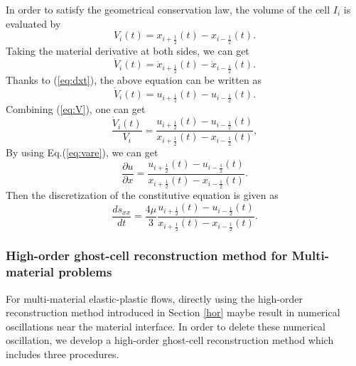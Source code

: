 \documentclass[review]{elsarticle}
\begin{document}
In order to satisfy the geometrical conservation law, the volume of the cell $I_i$ is evaluated by
\begin{equation}\label{eq:V}
  V_i(t) = x_{i+\frac{1}{2}}(t) - x_{i-\frac{1}{2}}(t).
\end{equation}
Taking the material derivative at both sides, we can get
\begin{equation}\label{eq:dotV}
  \dot{V}_i(t) = \dot{x}_{i+\frac{1}{2}}(t) - \dot{x}_{i-\frac{1}{2}}(t).
\end{equation}
Thanks to (\ref{eq:dxt}), the above equation can be written as
\begin{equation}\label{eq:dotV}
  \dot{V}_i(t) = u_{i+\frac{1}{2}}(t) - u_{i-\frac{1}{2}}(t).
\end{equation}
Combining (\ref{eq:V}), one can get
\begin{equation}
  \frac{\dot{V}_i(t)}{V_i} =\frac{ u_{i+\frac{1}{2}}(t) - u_{i-\frac{1}{2}}(t)}{ x_{i+\frac{1}{2}}(t) - x_{i-\frac{1}{2}}(t)},
\end{equation}
By using Eq.(\ref{eq:vare}), we can get
\begin{equation}
  \frac{\partial u}{\partial x} =\frac{ u_{i+\frac{1}{2}}(t) - u_{i-\frac{1}{2}}(t)}{ x_{i+\frac{1}{2}}(t) - x_{i-\frac{1}{2}}(t)}.
\end{equation}
Then  the  discretization of the constitutive equation is given as
\begin{equation}\label{eq:semSxx}
  \frac{d s_{xx}}{dt } =\frac{4\mu}{3} \frac{ u_{i+\frac{1}{2}}(t) - u_{i-\frac{1}{2}}(t)}{ x_{i+\frac{1}{2}}(t) - x_{i-\frac{1}{2}}(t)}.
\end{equation}


\subsubsection{High-order ghost-cell reconstruction method for Multi-material problems}

For multi-material elastic-plastic flows, directly using the high-order reconstruction method introduced in  Section \ref{hor} maybe result in numerical oscillations near the material interface. In order to delete these numerical oscillation, we develop a high-order ghost-cell reconstruction method which includes three procedures.
\end{document}
